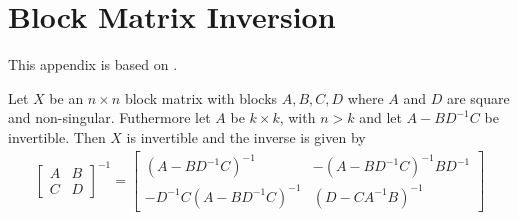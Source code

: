\chapter{Block Matrix Inversion}\label{ch:block_matrix_inversion}
This appendix is based on \cite{Bierens2013}.
\begin{theorem}
    Let $X$ be an $n \times n$ block matrix with blocks $A, B, C, D$ where $A$ and $D$ are square and non-singular.
    Futhermore let $A$ be $k \times k$, with $n > k$ and let $A-BD^{-1}C$ be invertible.
    Then $X$ is invertible and the inverse is given by
    \begin{align}
        \begin{bmatrix}
            A & B \\
            C & D
        \end{bmatrix}^{-1}
        =
        \begin{bmatrix}
            (A - BD^{-1}C)^{-1} &
            -(A - BD^{-1}C)^{-1}BD^{-1} \\
            -D^{-1}C(A - BD^{-1}C)^{-1} &
            (D - CA^{-1}B)^{-1}
        \end{bmatrix}
    \end{align}
\end{theorem}
